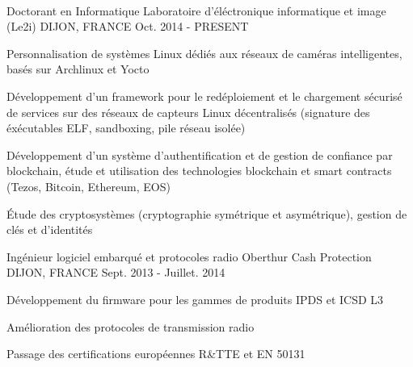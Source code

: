 ~\vspace{0.2cm}



\begin{cventries}

  \cventry
    {Doctorant en Informatique} %
    {Laboratoire d'éléctronique informatique et image (Le2i)} %
    {DIJON, FRANCE} %
    {Oct. 2014 - PRESENT} %
    {
      \begin{cvitems} %
      \item {Personnalisation de systèmes Linux dédiés aux réseaux de caméras intelligentes, basés sur Archlinux et Yocto}
      \item {Développement d'un framework pour le redéploiement et le chargement sécurisé de services sur des réseaux de capteurs Linux décentralisés (signature des éxécutables ELF, sandboxing, pile réseau isolée)}
      \item {Développement d'un système d'authentification et de gestion de confiance par blockchain, étude et utilisation des technologies blockchain et smart contracts (Tezos, Bitcoin, Ethereum, EOS)}
      \item {\'Etude des cryptosystèmes (cryptographie symétrique et asymétrique), gestion de clés et d'identités}
      \end{cvitems}
    }

  \cventry
    {Ingénieur logiciel embarqué et protocoles radio} %
    {Oberthur Cash Protection} %
    {DIJON, FRANCE} %
    {Sept. 2013 - Juillet. 2014} %
    {
      \begin{cvitems} %
      \item {Développement du firmware pour les gammes de produits IPDS et ICSD L3}
      \item {Amélioration des protocoles de transmission radio}
      \item {Passage des certifications européennes R\&TTE et EN 50131}
      \end{cvitems}
    }


\end{cventries}
